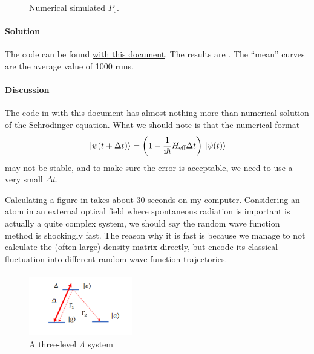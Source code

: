 \documentclass[hyperref, a4paper]{article}
\newcommand*{\ii}{\mathrm{i}}
\begin{document}
\begin{figure}
\begin{subfigure}{0.45\textwidth}
        \subcaption{}
    \end{subfigure}
    \caption{Numerical simulated $P_\text{e}$.}
    \label{fig:numerical-wave}
\end{figure}

\paragraph{Solution} The code can be found \href{simulation.jl}{with this document}. The results are 
. The ``mean'' curves are the average value of 1000 runs. 

\paragraph{Discussion} The code in \href{simulation.jl}{with this document} has almost nothing more than
numerical solution of the Schrödinger equation. What we should note is that the numerical format 
\begin{equation}
    \ket*{\psi(t + \Delta t)} = \left( 1 - \frac{1}{\ii \hbar} H_\text{eff} \Delta t \right) \ket*{\psi(t)}
\end{equation}
may not be stable, and to make sure the error is acceptable, we need to use a very small $\Delta t$.

Calculating a figure in  takes about 30 seconds on my computer. Considering 
an atom in an external optical field where spontaneous radiation is important is actually a quite complex
system, we should say the random wave function method is shockingly fast. The reason why it is fast is because 
we manage to not calculate the (often large) density matrix directly, but encode its classical fluctuation 
into different random wave function trajectories.

\paragraph{}

\begin{figure}
    \centering
    \includegraphics[width=0.4\textwidth]{fig1.png}
    \caption{A three-level $\Lambda$ system}
    \label{fig:sys-1}
\end{figure}
\end{document}
